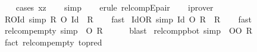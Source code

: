 \begin{isabellebody}
%
\isadelimproof
\ \ %
\endisadelimproof
%
\isatagproof
{}\isamarkupfalse%
\ {\isacharparenleft}{\kern0pt}cases\ xz{\isacharparenright}{\kern0pt}\isanewline
\ \ \isamarkupfalse%
\ simp\isanewline
\ \ \isamarkupfalse%
\ {\isacharparenleft}{\kern0pt}erule\ relcompEpair{\isacharparenright}{\kern0pt}\isanewline
\ \ \isamarkupfalse%
\ iprover\isanewline
\ \ \isamarkupfalse%
%
\endisatagproof
{\isafoldproof}%
%
\isadelimproof
\isanewline
%
\endisadelimproof
\isanewline
{}\isamarkupfalse%
\ R{\isacharunderscore}{\kern0pt}O{\isacharunderscore}{\kern0pt}Id\ {\isacharbrackleft}{\kern0pt}simp{\isacharbrackright}{\kern0pt}{\isacharcolon}{\kern0pt}\ {\isachardoublequoteopen}R\ O\ Id\ {\isacharequal}{\kern0pt}\ R{\isachardoublequoteclose}\isanewline
%
\isadelimproof
\ \ %
\endisadelimproof
%
\isatagproof
{}\isamarkupfalse%
\ fast%
\endisatagproof
{\isafoldproof}%
%
\isadelimproof
\isanewline
%
\endisadelimproof
\isanewline
{}\isamarkupfalse%
\ Id{\isacharunderscore}{\kern0pt}O{\isacharunderscore}{\kern0pt}R\ {\isacharbrackleft}{\kern0pt}simp{\isacharbrackright}{\kern0pt}{\isacharcolon}{\kern0pt}\ {\isachardoublequoteopen}Id\ O\ R\ {\isacharequal}{\kern0pt}\ R{\isachardoublequoteclose}\isanewline
%
\isadelimproof
\ \ %
\endisadelimproof
%
\isatagproof
{}\isamarkupfalse%
\ fast%
\endisatagproof
{\isafoldproof}%
%
\isadelimproof
\isanewline
%
\endisadelimproof
\isanewline
{}\isamarkupfalse%
\ relcomp{\isacharunderscore}{\kern0pt}empty{}\ {\isacharbrackleft}{\kern0pt}simp{\isacharbrackright}{\kern0pt}{\isacharcolon}{\kern0pt}\ {\isachardoublequoteopen}{\isacharbraceleft}{\kern0pt}{\isacharbraceright}{\kern0pt}\ O\ R\ {\isacharequal}{\kern0pt}\ {\isacharbraceleft}{\kern0pt}{\isacharbraceright}{\kern0pt}{\isachardoublequoteclose}\isanewline
%
\isadelimproof
\ \ %
\endisadelimproof
%
\isatagproof
{}\isamarkupfalse%
\ blast%
\endisatagproof
{\isafoldproof}%
%
\isadelimproof
\isanewline
%
\endisadelimproof
\isanewline
{}\isamarkupfalse%
\ relcompp{\isacharunderscore}{\kern0pt}bot{}\ {\isacharbrackleft}{\kern0pt}simp{\isacharbrackright}{\kern0pt}{\isacharcolon}{\kern0pt}\ {\isachardoublequoteopen}{\isasymbottom}\ OO\ R\ {\isacharequal}{\kern0pt}\ {\isasymbottom}{\isachardoublequoteclose}\isanewline
%
\isadelimproof
\ \ %
\endisadelimproof
%
\isatagproof
{}\isamarkupfalse%
\ {\isacharparenleft}{\kern0pt}fact\ relcomp{\isacharunderscore}{\kern0pt}empty{}\ {\isacharbrackleft}{\kern0pt}to{\isacharunderscore}{\kern0pt}pred{\isacharbrackright}{\kern0pt}{\isacharparenright}{\kern0pt}%

\end{isabellebody}
